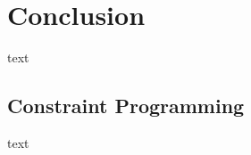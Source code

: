 \let\textcircled=\pgftextcircled
\chapter{Conclusion}
\label{chap:8}
text



\section{Constraint Programming}
\label{sec:subsec_cp}

text



